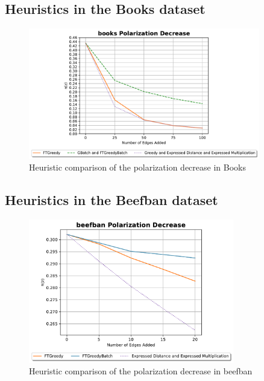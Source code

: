 \subsection{Heuristics in the Books dataset}

\begin{figure}[!htbp]
	\centering
	\captionsetup{justification=centering,margin=2cm}
	\includegraphics[width=0.90\textwidth]{Figures/books Polarization Decrease}
	\caption{Heuristic comparison of the polarization decrease in Books}
	\label{fig:books_pol}
\end{figure}


\clearpage


\subsection{Heuristics in the Beefban dataset}

\begin{figure}[!htbp]
	\centering
	\captionsetup{justification=centering,margin=2cm}
	\includegraphics[width=0.8\textwidth]{Figures/beefban Polarization Decrease}
	\caption{Heuristic comparison of the polarization decrease in beefban}
	\label{fig:beefban_pol}
\end{figure}

